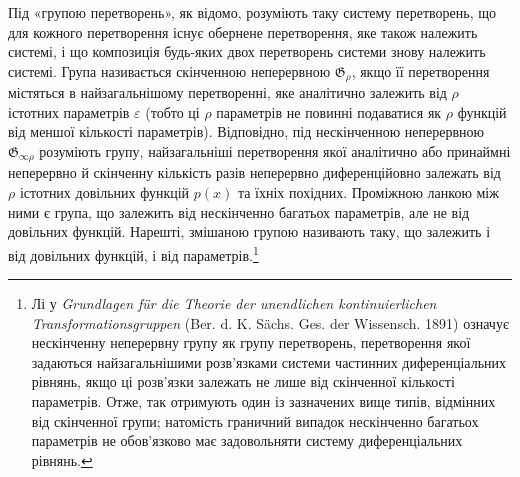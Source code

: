 \documentclass[11pt]{article}
\providecommand{\G}{\mathfrak G}
\providecommand{\eps}{\varepsilon}
\begin{document}
Під «групою перетворень», як відомо, розуміють таку систему перетворень, що для кожного перетворення існує обернене перетворення, яке також належить системі, і що композиція будь-яких двох перетворень системи знову належить системі. Група називається скінченною неперервною \(\G_\rho\), якщо її перетворення містяться в найзагальнішому перетворенні, яке аналітично залежить від \(\rho\) істотних параметрів \(\eps\) (тобто ці \(\rho\) параметрів не повинні подаватися як \(\rho\) функцій від меншої кількості параметрів). Відповідно, під нескінченною неперервною \(\G_{\infty\rho}\) розуміють групу, найзагальніші перетворення якої аналітично або принаймні неперервно й скінченну кількість разів неперервно диференційовно залежать від \(\rho\) істотних довільних функцій \(p(x)\) та їхніх похідних. Проміжною ланкою між ними є група, що залежить від нескінченно багатьох параметрів, але не від довільних функцій. Нарешті, змішаною групою називають таку, що залежить і від довільних функцій, і від параметрів.\footnote{Лі у \emph{Grundlagen für die Theorie der unendlichen kontinuierlichen Transformationsgruppen} (Ber. d. K. Sächs. Ges. der Wissensch. 1891) означує нескінченну неперервну групу як групу перетворень, перетворення якої задаються найзагальнішими розв'язками системи частинних диференціальних рівнянь, якщо ці розв'язки залежать не лише від скінченної кількості параметрів. Отже, так отримують один із зазначених вище типів, відмінних від скінченної групи; натомість граничний випадок нескінченно багатьох параметрів не обов'язково має задовольняти систему диференціальних рівнянь.}
\end{document}
